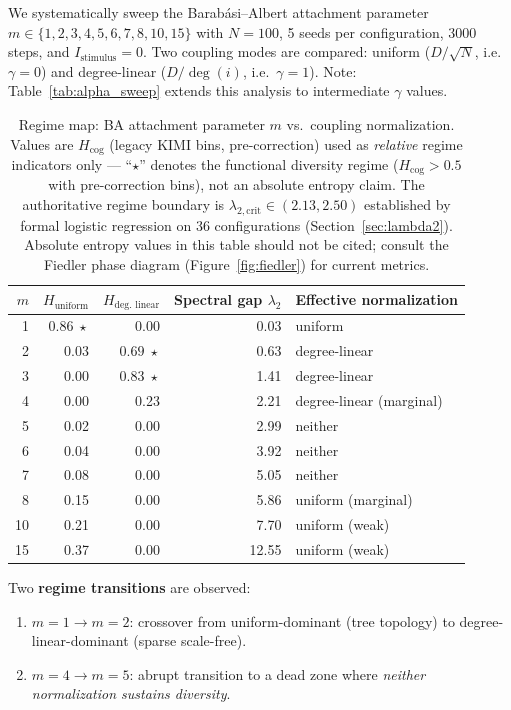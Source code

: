 \documentclass[11pt]{article}
\begin{document}
We systematically sweep the Barab\'asi--Albert attachment parameter $m \in \{1, 2, 3, 4, 5, 6, 7, 8, 10, 15\}$ with $N = 100$, 5 seeds per configuration, 3000 steps, and $I_{\text{stimulus}} = 0$. Two coupling modes are compared: uniform ($D/\sqrt{N}$, i.e.\ $\gamma = 0$) and degree-linear ($D/\deg(i)$, i.e.\ $\gamma = 1$). Note: Table~\ref{tab:alpha_sweep} extends this analysis to intermediate $\gamma$ values.

\begin{table}[ht]
\centering
\caption{Regime map: BA attachment parameter $m$ vs.\ coupling normalization. Values are $H_{\text{cog}}$ (legacy KIMI bins, pre-correction) used as \emph{relative} regime indicators only — ``$\star$'' denotes the functional diversity regime ($H_{\text{cog}} > 0.5$ with pre-correction bins), not an absolute entropy claim. The authoritative regime boundary is $\lambda_{2,\mathrm{crit}} \in (2.13, 2.50)$ established by formal logistic regression on 36 configurations (Section~\ref{sec:lambda2}). Absolute entropy values in this table should not be cited; consult the Fiedler phase diagram (Figure~\ref{fig:fiedler}) for current metrics.}
\label{tab:ba_m_sweep}
\begin{tabular}{rrrrl}
\toprule
$m$ & $H_{\text{uniform}}$ & $H_{\text{deg.\ linear}}$ & Spectral gap $\lambda_2$ & Effective normalization \\
\midrule
1  & $0.86\;\star$ & 0.00 & 0.03 & uniform \\
2  & 0.03 & $0.69\;\star$ & 0.63 & degree-linear \\
3  & 0.00 & $0.83\;\star$ & 1.41 & degree-linear \\
4  & 0.00 & 0.23 & 2.21 & degree-linear (marginal) \\
5  & 0.02 & 0.00 & 2.99 & neither \\
6  & 0.04 & 0.00 & 3.92 & neither \\
7  & 0.08 & 0.00 & 5.05 & neither \\
8  & 0.15 & 0.00 & 5.86 & uniform (marginal) \\
10 & 0.21 & 0.00 & 7.70 & uniform (weak) \\
15 & 0.37 & 0.00 & 12.55 & uniform (weak) \\
\bottomrule
\end{tabular}
\end{table}

Two \textbf{regime transitions} are observed:
\begin{enumerate}
\item $m = 1 \to m = 2$: crossover from uniform-dominant (tree topology) to degree-linear-dominant (sparse scale-free).
\item $m = 4 \to m = 5$: abrupt transition to a dead zone where \emph{neither normalization sustains diversity}.
\end{enumerate}
\end{document}
